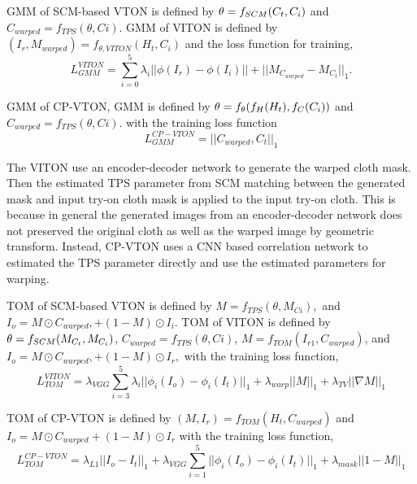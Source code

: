 GMM of SCM-based VTON is defined by  
$
   \bold{\theta} = f_{SCM} (C_t, C_i)
$
and
$
   C_{warped} = f_{TPS}(\theta, Ci)
$.    
GMM of VITON is defined by 
$
   (I_{r}, M_{warped}) = f_{\theta, VITON} (H_t, C_i) 
$
and the loss function for training, 
\begin{equation}
   L_{GMM}^{VITON} =   \sum_{i=0}^{5} \lambda_i || \phi (I_r) - \phi (I_i)||  + 
   ||M_{C_{warped}} -  M_{C_t}||_1 .
\end{equation}

GMM of CP-VTON, GMM is defined by 
$  
   \bold{\theta} = f_{\theta} ( f_H (H_t), f_C(C_i) )
$
and
$
   C_{warped} = f_{TPS}(\theta, Ci).
$    
with the training loss function
\begin{equation}
   L_{GMM}^{CP-VTON} =  ||C_{warped}, C_t||_1
\end{equation}

The VITON use an encoder-decoder network to generate the warped cloth mask. Then the estimated TPS parameter from SCM matching between the generated mask and input try-on cloth mask is applied to the input try-on cloth. This is because in general the generated images from an encoder-decoder network does not preserved the original cloth as well as the warped image by geometric transform. Instead, CP-VTON uses a CNN based correlation network to estimated the TPS parameter directly and use the estimated parameters for warping.   


TOM  of SCM-based VTON  is defined by 
$
   M = f_{TPS}(\theta, M_{Ci}),
$    
and 
$
   I_o = M \odot C_{warped}, + (1-M) \odot I_i 
$.
TOM of VITON is defined by 
$
   \bold{\theta} = f_{SCM} (M_{C_t}, M_{C_i})
$,
$
   C_{warped} = f_{TPS}(\theta, Ci)
$,    
$
 M = f_{TOM} ( I_{r1}, C_{warped} ) 
$, 
and 
$
   I_o = M \odot C_{warped}, + (1-M) \odot I_{r},
$
with the training loss function, 
\begin{equation}
   L_{TOM}^{VITON} = \lambda_{VGG} \sum_{i=3}^{5} \lambda_i || \phi_i(I_o) - \phi_i(I_t)||_{1}  + 
             \lambda_{warp}  || M ||_{1}  + 
             \lambda_{TV} || \nabla M||_{1}      
\end{equation}

TOM of CP-VTON is defined by 
$
 (M, I_r) = f_{TOM} ( H_t, C_{warped} )  
$
and 
$
   I_o = M \odot C_{warped} + (1-M) \odot I_r
$
with the training loss function, 
\begin{equation}
   L_{TOM}^{CP-VTON} = \lambda_{L1}  || I_o - I_t ||_1  + 
             \lambda_{VGG} \sum_{i=1}^{5} || \phi_i(I_o) - \phi_i(I_t)||_1  + 
             \lambda_{mask} || 1 - M ||_1      
\end{equation}



